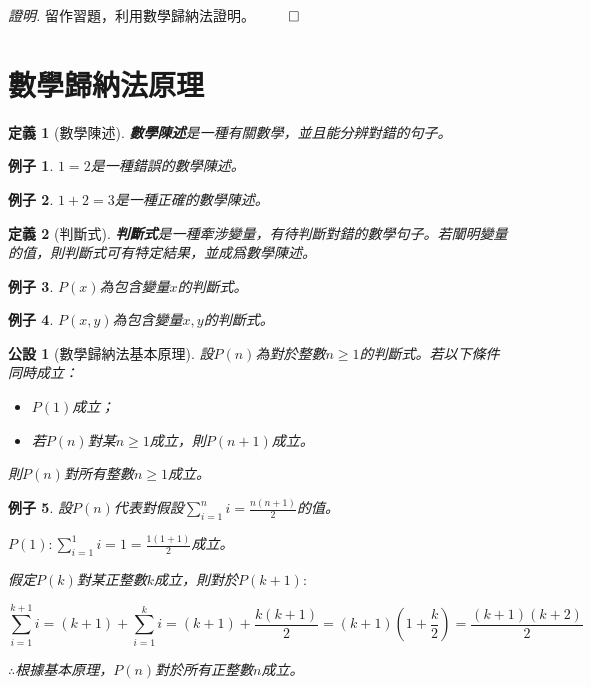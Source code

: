 \documentclass[12pt]{article}
\newtheorem{definition}{定義}
\newtheorem*{example}{例子}
\newtheorem*{axiom}{公設}
\renewenvironment*{proof}{\textit{證明.}}{\hfill$\qed$}
\begin{document}
    \begin{proof}
        留作習題，利用數學歸納法證明。
    \end{proof}

    \section*{數學歸納法原理}

    \begin{definition}[數學陳述]
        \textbf{數學陳述}是一種有關數學，並且能分辨對錯的句子。
    \end{definition}

    \begin{example}
        $1=2$是一種錯誤的數學陳述。
    \end{example}

    \begin{example}
        $1+2=3$是一種正確的數學陳述。
    \end{example}

    \begin{definition}[判斷式]
        \textbf{判斷式}是一種牽涉變量，有待判斷對錯的數學句子。若闡明變量的值，則判斷式可有特定結果，並成爲數學陳述。
    \end{definition}

    \begin{example}
        $P(x)$為包含變量$x$的判斷式。
    \end{example}
    
    \begin{example}
        $P(x,y)$為包含變量$x,y$的判斷式。
    \end{example}

    \begin{axiom}[數學歸納法基本原理]
        設$P(n)$為對於整數$n\geq 1$的判斷式。若以下條件同時成立：\begin{itemize}
            \item $P(1)$成立；
            \item 若$P(n)$對某$n\geq 1$成立，則$P(n+1)$成立。
        \end{itemize}
        則$P(n)$對所有整數$n\geq 1$成立。
    \end{axiom}

    \begin{example}
        設$P(n)$代表對假設$\displaystyle\sum_{i=1}^{n}i=\frac{n(n+1)}{2}$的值。

        $P(1):\sum_{i=1}^{1}i=1=\frac{1(1+1)}{2}$成立。

        假定$P(k)$對某正整數$k$成立，則對於$P(k+1):$

        $$\sum_{i=1}^{k+1}i=(k+1)+\sum_{i=1}^{k}i=(k+1)+\frac{k(k+1)}{2}=(k+1)(1+\frac{k}{2})=\frac{(k+1)(k+2)}{2}$$

        $\therefore$根據基本原理，$P(n)$對於所有正整數$n$成立。
    \end{example}
\end{document}
